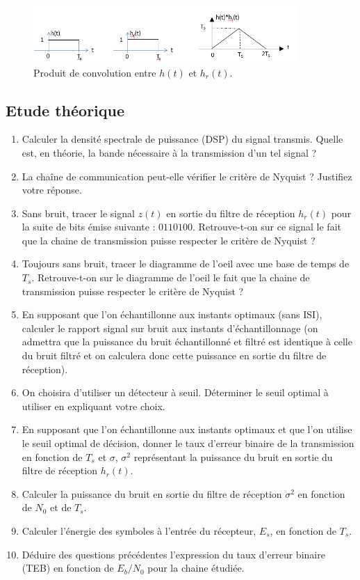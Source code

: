 \documentclass{article}
\begin{document}
\begin{figure}[ht!]
\centering
\includegraphics[width=10cm]{figure2.png}
\caption{Produit de convolution entre $h(t)$ et $h_r(t)$.}
\label{prod_conv1}
\end{figure}

\subsection{Etude théorique}

    \begin{enumerate}
        \item Calculer la densité spectrale de puissance (DSP) du signal transmis. Quelle est, en théorie, la bande nécessaire à la transmission d'un tel signal ?
        \item La chaîne de communication peut-elle vérifier le critère de Nyquist ? Justifiez votre réponse.
        \item Sans bruit, tracer le signal $z(t)$ en sortie du filtre de réception $h_r(t)$ pour la suite de bits émise suivante : $0110100$. Retrouve-t-on sur ce signal le fait que la chaine de transmission puisse respecter le critère de Nyquist ?
        \item Toujours sans bruit, tracer le diagramme de l'oeil avec une base de temps de $T_s$. Retrouve-t-on sur le diagramme de l'oeil le fait que la chaine de transmission puisse respecter le critère de Nyquist ?
        \item En supposant que l'on échantillonne aux instants optimaux (sans ISI), calculer le rapport signal sur bruit aux instants d'échantillonnage (on admettra que la puissance du bruit échantillonné et filtré est identique à celle du bruit filtré et on calculera donc cette puissance en sortie du filtre de réception).
        \item On choisira d'utiliser un détecteur à seuil. Déterminer le seuil optimal à utiliser en expliquant votre choix.
        \item En supposant que l'on échantillonne aux instants optimaux et que l'on utilise le seuil optimal de décision, donner le taux d'erreur binaire de la transmission en fonction de $T_s$ et $\sigma$, $\sigma^2$ représentant la puissance du bruit en sortie du filtre de réception $h_r(t)$.
        \item Calculer la puissance du bruit en sortie du filtre de réception $\sigma^2$ en fonction de $N_0$ et de $T_s$.
        \item Calculer l'énergie des symboles à l'entrée du récepteur, $E_s$, en fonction de $T_s$.
        \item Déduire des questions précédentes l'expression du taux d'erreur binaire (TEB) en fonction de $E_b/N_0$ pour la chaine étudiée.
    \end{enumerate}
\end{document}
